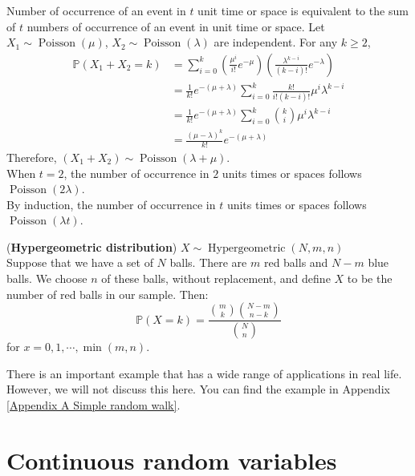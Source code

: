 \documentclass{huhtakm-template-book}
\newcommand{\prob}{\mathbb{P}}
\DeclareMathOperator{\Poisson}{Poisson}
\DeclareMathOperator{\Hypergeometric}{Hypergeometric}
\begin{document}
\begin{proofing}
	Number of occurrence of an event in $t$ unit time or space is equivalent to the sum of $t$ numbers of occurrence of an event in unit time or space. Let $X_{1}\sim\Poisson(\mu)$, $X_{2}\sim\Poisson(\lambda)$ are independent. For any $k\geq 2$,
	\begin{align*}
		\prob(X_{1}+X_{2}=k)&=\sum_{i=0}^{k}\left(\frac{\mu^{i}}{i!}e^{-\mu}\right)\left(\frac{\lambda^{k-i}}{(k-i)!}e^{-\lambda}\right)\\
		&=\frac{1}{k!}e^{-(\mu+\lambda)}\sum_{i=0}^{k}\frac{k!}{i!(k-i)!}\mu^{i}\lambda^{k-i}\\
		&=\frac{1}{k!}e^{-(\mu+\lambda)}\sum_{i=0}^{k}\binom{k}{i}\mu^{i}\lambda^{k-i}\\
		&=\frac{(\mu-\lambda)^{k}}{k!}e^{-(\mu+\lambda)}
	\end{align*}
	Therefore, $(X_{1}+X_{2})\sim\Poisson(\lambda+\mu)$.\\
	When $t=2$, the number of occurrence in $2$ units times or spaces follows $\Poisson(2\lambda)$.\\
	By induction, the number of occurrence in $t$ units times or spaces follows $\Poisson(\lambda t)$.
\end{proofing}
\begin{eg}(\textbf{Hypergeometric distribution}) $X\sim\Hypergeometric(N,m,n)$\\
	Suppose that we have a set of $N$ balls. There are $m$ red balls and $N-m$ blue balls. We choose $n$ of these balls, without replacement, and define $X$ to be the number of red balls in our sample. Then:
	\begin{equation*}
		\prob(X=k)=\frac{\binom{m}{k}\binom{N-m}{n-k}}{\binom{N}{n}}
	\end{equation*}
	for $x=0,1,\cdots,\min(m,n)$.
\end{eg}

There is an important example that has a wide range of applications in real life. However, we will not discuss this here. You can find the example in Appendix \ref{Appendix A Simple random walk}.

\chapter{Continuous random variables}
\end{document}
